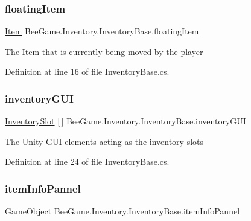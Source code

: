 \subsubsection{\texorpdfstring{floating\+Item}{floatingItem}}
{\footnotesize\ttfamily \hyperlink{struct_bee_game_1_1_items_1_1_item}{Item} Bee\+Game.\+Inventory.\+Inventory\+Base.\+floating\+Item}



The Item that is currently being moved by the player 



Definition at line 16 of file Inventory\+Base.\+cs.

\mbox{\label{class_bee_game_1_1_inventory_1_1_inventory_base_a48dcba7ad7bfa1bed8c9ae290fb32857}} 
\subsubsection{\texorpdfstring{inventory\+G\+UI}{inventoryGUI}}
{\footnotesize\ttfamily \hyperlink{class_bee_game_1_1_inventory_1_1_inventory_slot}{Inventory\+Slot} \mbox{[}$\,$\mbox{]} Bee\+Game.\+Inventory.\+Inventory\+Base.\+inventory\+G\+UI}



The Unity G\+UI elements acting as the inventory slots 



Definition at line 24 of file Inventory\+Base.\+cs.

\mbox{\label{class_bee_game_1_1_inventory_1_1_inventory_base_af1def3187f007a5a3bb6fbe71854afdc}} 
\subsubsection{\texorpdfstring{item\+Info\+Pannel}{itemInfoPannel}}
{\footnotesize\ttfamily Game\+Object Bee\+Game.\+Inventory.\+Inventory\+Base.\+item\+Info\+Pannel}



